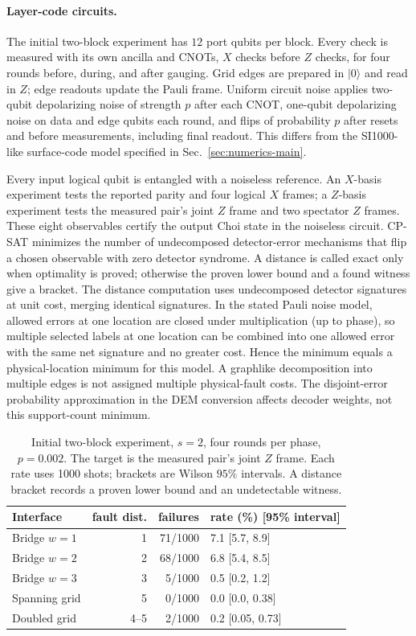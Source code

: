 \paragraph{Layer-code circuits.}
The initial two-block experiment has $12$ port qubits per block. Every
check is measured with its own ancilla and CNOTs, $X$ checks before $Z$
checks, for four rounds before, during, and after gauging. Grid edges are
prepared in $|0\rangle$ and read in $Z$; edge readouts update the Pauli
frame. Uniform circuit noise applies two-qubit depolarizing noise of
strength $p$ after each CNOT, one-qubit depolarizing noise on data and edge
qubits each round, and flips of probability $p$ after resets and before
measurements, including final readout. This differs from the SI1000-like
surface-code model specified in Sec.~\ref{sec:numerics-main}.

Every input logical qubit is entangled with a noiseless reference.
An $X$-basis experiment tests the reported parity and four logical $X$
frames; a $Z$-basis experiment tests the measured pair's joint $Z$ frame
and two spectator $Z$ frames. These eight observables certify the output
Choi state in the noiseless circuit. CP-SAT minimizes the number of undecomposed
detector-error mechanisms that flip a chosen observable with zero detector
syndrome. A distance is called exact only when optimality is proved;
otherwise the proven lower bound and a found witness give a bracket.
The distance computation uses undecomposed detector signatures at unit
cost, merging identical signatures. In the stated Pauli noise model,
allowed errors at one location are closed under multiplication (up to
phase), so multiple selected labels at one location can be combined into
one allowed error with the same net signature and no greater cost. Hence
the minimum equals a physical-location minimum for this model. A
graphlike decomposition into multiple edges is not assigned multiple
physical-fault costs. The disjoint-error probability approximation in the
DEM conversion affects decoder weights, not this support-count minimum.

\begin{table}[t]
\caption{Initial two-block experiment, $s=2$, four rounds per phase,
$p=0.002$. The target is the measured pair's joint $Z$ frame. Each rate
uses 1000 shots; brackets are Wilson $95\%$ intervals. A distance bracket
records a proven lower bound and an undetectable witness.}
\label{tab:standalone-interface}
\centering\scriptsize
\setlength{\tabcolsep}{3pt}
\begin{tabular}{@{}lrrl@{}}
\toprule
Interface & fault dist. & failures & rate (\%) [95\% interval]\\
\midrule
Bridge $w=1$ & 1 & 71/1000 & 7.1 [5.7, 8.9]\\
Bridge $w=2$ & 2 & 68/1000 & 6.8 [5.4, 8.5]\\
Bridge $w=3$ & 3 & 5/1000 & 0.5 [0.2, 1.2]\\
Spanning grid & 5 & 0/1000 & 0.0 [0.0, 0.38]\\
Doubled grid & 4--5 & 2/1000 & 0.2 [0.05, 0.73]\\
\bottomrule
\end{tabular}
\end{table}


